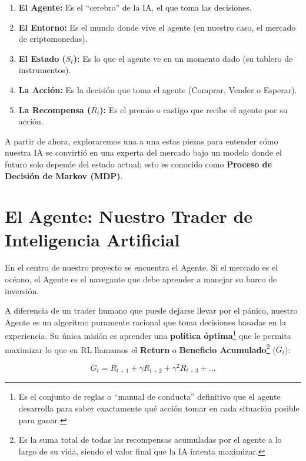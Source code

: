\documentclass[12pt,a4paper]{article}
\begin{document}
\begin{enumerate}
    \item \textbf{El Agente}\textbf{:} Es el ``cerebro'' de la IA, el que toma las decisiones.
    \item \textbf{El Entorno:} Es el mundo donde vive el agente (en nuestro caso, el mercado de criptomonedas).
    \item \textbf{El Estado ($S_t$):} Es lo que el agente ve en un momento dado (su tablero de instrumentos).
    \item \textbf{La Acción}\textbf{:} Es la decisión que toma el agente (Comprar, Vender o Esperar).
    \item \textbf{La Recompensa ($R_t$):} Es el premio o castigo que recibe el agente por su acción.
\end{enumerate}

A partir de ahora, exploraremos una a una estas piezas para entender cómo nuestra IA se convirtió en una experta del mercado bajo un modelo donde el futuro solo depende del estado actual; esto es conocido como \textbf{Proceso de Decisión de Markov (MDP)}.

\section{El Agente: Nuestro Trader de Inteligencia Artificial}

En el centro de nuestro proyecto se encuentra el Agente. Si el mercado es el océano, el Agente es el navegante que debe aprender a manejar su barco de inversión. 

A diferencia de un trader humano que puede dejarse llevar por el pánico, nuestro Agente es un algoritmo puramente racional que toma decisiones basadas en la experiencia. Su única misión es aprender una \textbf{política óptima}\footnote{Es el conjunto de reglas o ``manual de conducta'' definitivo que el agente desarrolla para saber exactamente qué acción tomar en cada situación posible para ganar.} que le permita maximizar lo que en RL llamamos el \textbf{Return} o \textbf{Beneficio Acumulado}\footnote{Es la suma total de todas las recompensas acumuladas por el agente a lo largo de su vida, siendo el valor final que la IA intenta maximizar.} ($G_t$):

\begin{equation}
    G_t = R_{t+1} + \gamma R_{t+2} + \gamma^2 R_{t+3} + \dots
\end{equation}
\end{document}
